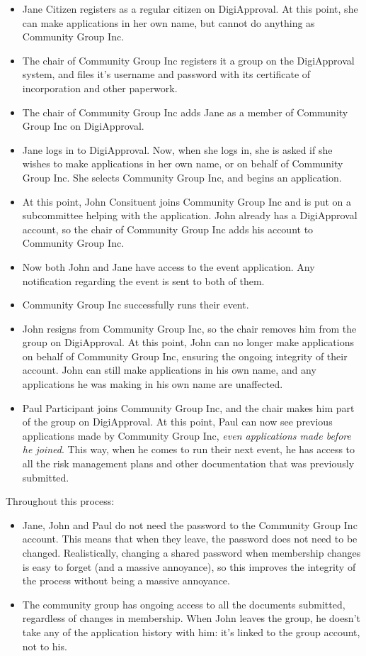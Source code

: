 \documentclass[12pt,a4paper,twosided]{article}
\begin{document}
\begin{itemize}
\item Jane Citizen registers as a regular citizen on DigiApproval. At this point, she can make applications in her own name, but cannot do anything as Community Group Inc.
\item The chair of Community Group Inc registers it a group on the DigiApproval system, and files it's username and password with its certificate of incorporation and other paperwork.
\item The chair of Community Group Inc adds Jane as a member of Community Group Inc on DigiApproval.
\item Jane logs in to DigiApproval. Now, when she logs in, she is asked if she wishes to make applications in her own name, or on behalf of Community Group Inc. She selects Community Group Inc, and begins an application.
\item At this point, John Consituent joins Community Group Inc and is put on a subcommittee helping with the application. John already has a DigiApproval account, so the chair of Community Group Inc adds his account to Community Group Inc.
\item Now both John and Jane have access to the event application. Any notification regarding the event is sent to both of them.
\item Community Group Inc successfully runs their event.
\item John resigns from Community Group Inc, so the chair removes him from the group on DigiApproval. At this point, John can no longer make applications on behalf of Community Group Inc, ensuring the ongoing integrity of their account. John can still make applications in his own name, and any applications he was making in his own name are unaffected.
\item Paul Participant joins Community Group Inc, and the chair makes him part of the group on DigiApproval. At this point, Paul can now see previous applications made by Community Group Inc, \emph{even applications made before he joined}. This way, when he comes to run their next event, he has access to all the risk management plans and other documentation that was previously submitted.
\end{itemize}

Throughout this process:
\begin{itemize}
\item Jane, John and Paul do not need the password to the Community Group Inc account. This means that when they leave, the password does not need to be changed. Realistically, changing a shared password when membership changes is easy to forget (and a massive annoyance), so this improves the integrity of the process without being a massive annoyance.
\item The community group has ongoing access to all the documents submitted, regardless of changes in membership. When John leaves the group, he doesn't take any of the application history with him: it's linked to the group account, not to his.
\end{itemize}
\end{document}
